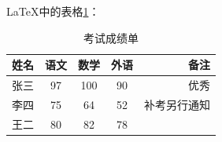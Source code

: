 \documentclass{article}
\begin{document}
	\LaTeX{}中的表格\ref{c}：
	\begin{table}[h]
		\centering
		\begin{tabular}{|l|c|c|c|r|}
			\hline
			姓名 & 语文 & 数学 & 外语 & 备注\\
			\hline
			张三 & 97 & 100 & 90 & 优秀\\
			\hline
			李四 & 75 & 64 & 52 & 补考另行通知\\
			\hline
			王二 & 80 & 82 & 78 & \\
			\hline
			
		\end{tabular}
		\caption{考试成绩单}
		\label{c}
		
	\end{table}
	
	
\end{document}
